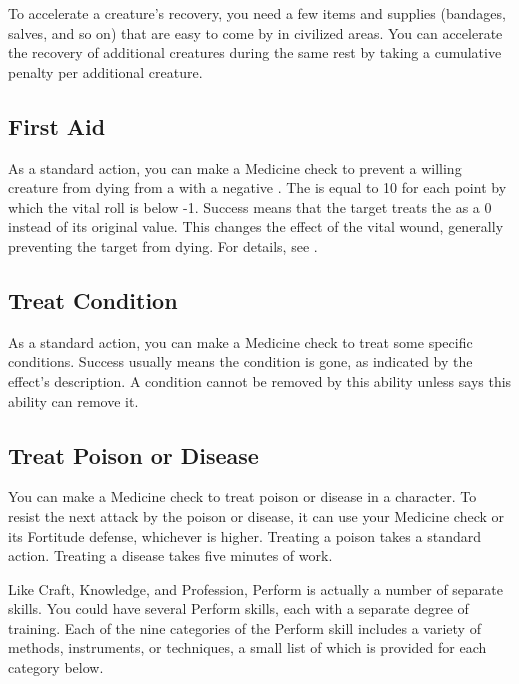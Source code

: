         To accelerate a creature's recovery, you need a few items and supplies (bandages, salves, and so on) that are easy to come by in civilized areas.
        You can accelerate the recovery of additional creatures during the same rest by taking a cumulative  penalty per additional creature.

    \subsection{First Aid}\label{First Aid}
        As a standard action, you can make a Medicine check to prevent a willing creature from dying from a  with a negative .
        The  is equal to 10  for each point by which the vital roll is below -1.
        Success means that the target treats the  as a 0 instead of its original value.
        This changes the effect of the vital wound, generally preventing the target from dying.
        For details, see .

    \subsection{Treat Condition}\label{Treat Condition}
        As a standard action, you can make a Medicine check to treat some specific conditions.
        Success usually means the condition is gone, as indicated by the effect's description.
        A condition cannot be removed by this ability unless says this ability can remove it.

    \subsection{Treat Poison or Disease}
        You can make a Medicine check to treat poison or disease in a character.
        To resist the next attack by the poison or disease, it can use your Medicine check or its Fortitude defense, whichever is higher.
        Treating a poison takes a standard action. Treating a disease takes five minutes of work.

\newpage
{}
        \par Like Craft, Knowledge, and Profession, Perform is actually a number of separate skills.
        You could have several Perform skills, each with a separate degree of training.
        Each of the nine categories of the Perform skill includes a variety of methods, instruments, or techniques, a small list of which is provided for each category below.


